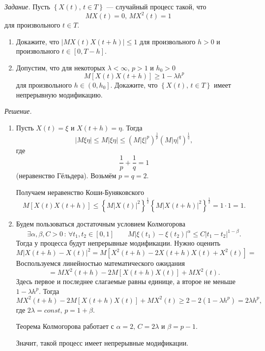 \textit{Задание.}
Пусть $ \left\{ X \left( t \right), \, t \in T \right\} $ --- случайный процесс такой, что
$$MX \left( t \right) = 0, \,
  MX^2 \left( t \right) = 1$$
для произвольного $t \in T$.
\begin{enumerate}[label=\alph*)]
  \item Докажите, что $ \left| MX \left( t \right) X \left( t + h \right) \right| \leq 1$
  для произвольного $h > 0$ и произвольного $t \in \left[ 0, T - h \right] $.
  \item Допустим, что для некоторых $ \lambda < \infty, \, p > 1$ и $h_0 > 0$
  $$M \left[ X \left( t \right) X \left( t + h \right) \right] \geq
    1 - \lambda h^p$$
  для произвольного $h \in \left( 0, h_0 \right] $.
  Докажите, что $ \left\{ X \left( t \right), \, t \in T \right\} $ имеет непрерывную модификацию.
\end{enumerate}

\textit{Решение.}
\begin{enumerate}[label=\alph*)]
  \item Пусть $X \left( t \right) = \xi $ и $X \left( t + h \right) = \eta $.
  Тогда
  $$ \left| M \xi \eta \right| \leq
    M \left| \xi \eta \right| \leq
    \left( M \left| \xi \right|^p \right)^{ \frac{1}{p}}
    \left( M \left| \eta \right|^q \right)^{ \frac{1}{q}},$$
  где
  $$ \frac{1}{p} + \frac{1}{q} =
    1$$
  (неравенство Гёльдера).
  Возьмём $p = q = 2$.

  Получаем неравенство Коши-Буняковского
  $$M \left[ X \left( t \right) X \left( t + h \right) \right] \leq
    \left\{ M \left| X \left( t \right) \right|^2 \right\}^{ \frac{1}{2}}
    \left\{ M \left| X \left( t + h \right) \right|^2 \right\}^{ \frac{1}{2}} =
    1 \cdot 1 =
    1.$$
  \item Будем пользоваться достаточным условием Колмогорова
  $$ \exists \alpha, \beta, C > 0 \, : \,
    \forall t_1, t_2 \in \left[ 0, 1 \right] \qquad
    M \left| \xi \left( t_1 \right) - \xi \left( t_2 \right) \right|^{ \alpha } \leq
    C \left| t_1 - t_2 \right|^{1 - \beta }.$$
  Тогда у процесса будут непрерывные модификации.
  Нужно оценить
  $$M \left| X \left( t + h \right) - X \left( t \right) \right|^2 =
    M\left[X^2\left(t+h\right)-2X\left(t+h\right)X\left(t\right)+X^2\left(t\right)\right] =$$
  Воспользуемся линейностью математического ожидания
  $$= MX^2 \left( t + h \right) - 2M \left[  X \left( t + h \right) X \left( t \right) \right] +
    MX^2 \left( t \right).$$
  Здесь первое и последнее слагаемые равны единице, а второе не меньше $1 - \lambda h^p$.
  Тогда
  $$MX^2 \left( t + h \right) - 2M \left[  X \left( t + h \right) X \left( t \right) \right] +
    MX^2 \left( t \right) \geq
    2 - 2 \left( 1 - \lambda h^p \right) =
    2 \lambda h^p,$$
  где $2 \lambda = const, \, p = 1 + \beta $.

  Теорема Колмогорова работает с $ \alpha = 2, \, C = 2 \lambda $ и $ \beta = p - 1$.

  Значит, такой процесс имеет непрерывные модификации.
\end{enumerate}

